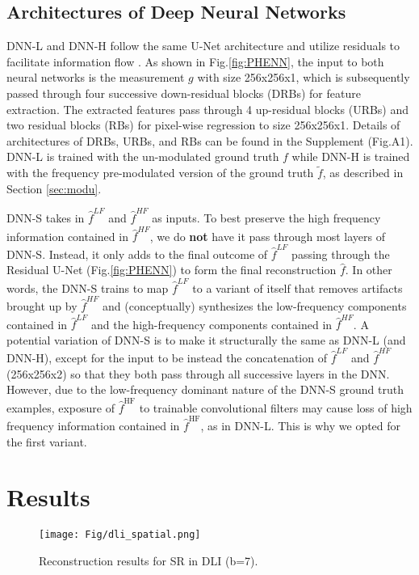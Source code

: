 \documentclass[10pt,twocolumn,letterpaper]{article}
\begin{document}
\subsection{Architectures of Deep Neural Networks}
DNN-L and DNN-H follow the same U-Net architecture \cite{ronneberger2015u} and utilize residuals to facilitate information flow  \cite{he2016deep}. As shown in Fig.\ref{fig:PHENN}, the input to both neural networks is the measurement $g$ with size 256x256x1, which is subsequently passed through four successive down-residual blocks (DRBs) for feature extraction. The extracted features pass through 4 up-residual blocks (URBs) and two residual blocks (RBs) for pixel-wise regression to size 256x256x1. Details of architectures of DRBs, URBs, and RBs can be found in the Supplement (Fig.A1). DNN-L is trained with the un-modulated ground truth $f$ while DNN-H is trained with the frequency pre-modulated version of the ground truth $\tilde{f}$, as described in Section \ref{sec:modu}. 

DNN-S takes in $\hat{f}^{LF}$ and $\hat{f}^{HF}$ as inputs. To best preserve the high frequency information contained in $\hat{f}^{HF}$, we do \textbf{not} have it pass through most layers of DNN-S. Instead, it only adds to the final outcome of $\hat{f}^{LF}$ passing through the Residual U-Net (Fig.\ref{fig:PHENN}) to form the final reconstruction $\hat{f}$. In other words, the DNN-S trains to map $\hat{f}^{LF}$ to a variant of itself that removes artifacts brought up by $\hat{f}^{HF}$ and (conceptually) synthesizes the low-frequency components contained in $\hat{f}^{LF}$ and the high-frequency components contained in $\hat{f}^{HF}$. A potential variation of DNN-S is to make it structurally the same as DNN-L (and DNN-H), except for the input to be instead the concatenation of $\hat{f}^{LF}$ and $\hat{f}^{HF}$(256x256x2) so that they both pass through all successive layers in the DNN. However, due to the low-frequency dominant nature of the DNN-S ground truth examples, exposure of $\hat{f}^{\text{HF}}$ to trainable convolutional filters may cause loss of high frequency information contained in $\hat{f}^{\text{HF}}$, as in DNN-L. This is why we opted for the first variant. 
\section{Results}
\label{sec:result}

\begin{figure*}[h!]
\centering\texttt{[image: Fig/dli\_spatial.png]}
\caption{Reconstruction results for SR in DLI (b=7).}
\label{fig:dli_spatial}
\end{figure*}
\end{document}
